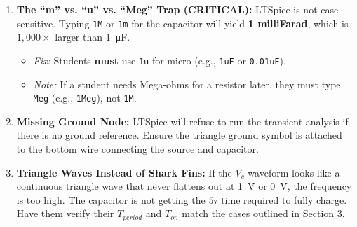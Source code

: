\documentclass[11pt]{article}
\begin{document}
\begin{enumerate}
  \item \textbf{The ``m'' vs. ``u'' vs. ``Meg'' Trap (CRITICAL):} LTSpice is not case-sensitive. Typing \texttt{1M} or \texttt{1m} for the capacitor will yield \textbf{1 milliFarad}, which is $1,000\times$ larger than \SI{1}{\micro\farad}.
    \begin{itemize}
      \item \textit{Fix:} Students \textbf{must} use \texttt{1u} for micro (e.g., \texttt{1uF} or \texttt{0.01uF}).
      \item \textit{Note:} If a student needs Mega-ohms for a resistor later, they must type \texttt{Meg} (e.g., \texttt{1Meg}), not \texttt{1M}.
    \end{itemize}
  \item \textbf{Missing Ground Node:} LTSpice will refuse to run the transient analysis if there is no ground reference. Ensure the triangle ground symbol is attached to the bottom wire connecting the source and capacitor.
  \item \textbf{Triangle Waves Instead of Shark Fins:} If the $V_c$ waveform looks like a continuous triangle wave that never flattens out at \SI{1}{\volt} or \SI{0}{\volt}, the frequency is too high. The capacitor is not getting the $5\tau$ time required to fully charge. Have them verify their $T_{period}$ and $T_{on}$ match the cases outlined in Section 3.
\end{enumerate}
\end{document}

